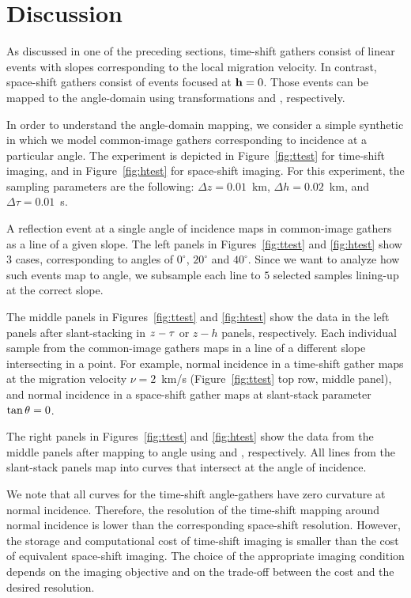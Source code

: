 \section{Discussion}
As discussed in one of the preceding sections, time-shift 
gathers consist of linear events with slopes corresponding
to the local migration velocity.
In contrast, space-shift gathers consist of events focused 
at $\hh=0$.
Those events can be mapped to the angle-domain using 
transformations  and , respectively.

In order to understand the angle-domain mapping, 
we consider a simple synthetic in which we model
common-image gathers corresponding to incidence at
a particular angle.
The experiment is depicted in Figure~\ref{fig:ttest}
for time-shift imaging, and in Figure~\ref{fig:htest}
for space-shift imaging.
For this experiment, the sampling parameters are the following:
$\Delta z=0.01$~km,
$\Delta h=0.02$~km, and
$\Delta \tau=0.01$~s.

A reflection event at a single angle of incidence 
maps in common-image gathers as a line of a given slope.
The left panels in Figures~\ref{fig:ttest} and \ref{fig:htest}
show $3$ cases, corresponding to angles of
$0^\circ$, $20^\circ$ and $40^\circ$.
Since we want to analyze how such events map to angle, 
we subsample each line to $5$ selected samples lining-up
at the correct slope.

The middle panels in Figures~\ref{fig:ttest} and \ref{fig:htest}
show the data in the left panels after slant-stacking
in $z-\tt$ or $z-h$ panels, respectively.
Each individual sample from the common-image gathers maps
in a line of a different slope intersecting in a point.
For example, normal incidence in a time-shift gather
maps at the migration velocity $\nu=2$~km/s 
(Figure~\ref{fig:ttest} top row, middle panel), and
normal incidence in a space-shift gather maps at
slant-stack parameter $\tan \t=0$.

The right panels in Figures~\ref{fig:ttest} and \ref{fig:htest}
show the data from the middle panels after mapping to angle
using  and , respectively.
All lines from the slant-stack panels map into curves
that intersect at the angle of incidence.

We note that all curves for the time-shift angle-gathers
have zero curvature at normal incidence.
Therefore, the resolution of the time-shift mapping around 
normal incidence is lower than the corresponding
space-shift resolution. 
However, the storage and computational cost of time-shift 
imaging is smaller than the cost of equivalent space-shift 
imaging. 
The choice of the appropriate imaging condition depends on 
the imaging objective and on the trade-off 
between the cost and the desired resolution.

